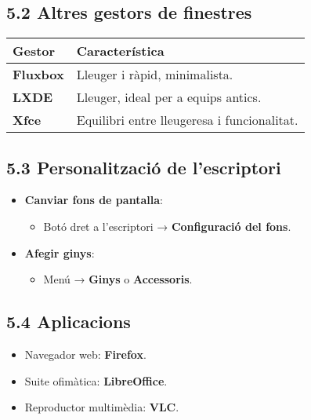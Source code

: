 \documentclass[
  a4paper,
]{article}
\providecommand{\tightlist}{%
  \setlength{\itemsep}{0pt}\setlength{\parskip}{0pt}}
\begin{document}
\subsection{5.2 Altres gestors de
finestres}\label{altres-gestors-de-finestres}

\begin{longtable}[]{@{}ll@{}}
\toprule\noalign{}
\textbf{Gestor} & \textbf{Característica} \\
\midrule\noalign{}
\endhead
\bottomrule\noalign{}
\endlastfoot
\textbf{Fluxbox} & Lleuger i ràpid, minimalista. \\
\textbf{LXDE} & Lleuger, ideal per a equips antics. \\
\textbf{Xfce} & Equilibri entre lleugeresa i funcionalitat. \\
\end{longtable}

\subsection{5.3 Personalització de
l'escriptori}\label{personalitzaciuxf3-de-lescriptori}

\begin{itemize}
\tightlist
\item
  \textbf{Canviar fons de pantalla}:

  \begin{itemize}
  \tightlist
  \item
    Botó dret a l'escriptori → \textbf{Configuració del fons}.
  \end{itemize}
\item
  \textbf{Afegir ginys}:

  \begin{itemize}
  \tightlist
  \item
    Menú → \textbf{Ginys} o \textbf{Accessoris}.
  \end{itemize}
\end{itemize}

\subsection{5.4 Aplicacions}\label{aplicacions}

\begin{itemize}
\tightlist
\item
  Navegador web: \textbf{Firefox}.
\item
  Suite ofimàtica: \textbf{LibreOffice}.
\item
  Reproductor multimèdia: \textbf{VLC}.
\end{itemize}
\end{document}
